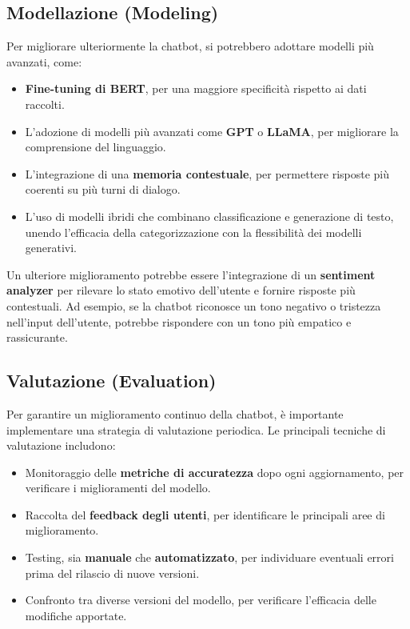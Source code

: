 \documentclass[12pt, letterpaper]{article}
\begin{document}
\subsection{Modellazione (Modeling)}
Per migliorare ulteriormente la chatbot, si potrebbero adottare modelli più avanzati, come:
\begin{itemize}
	\item \textbf{Fine-tuning di BERT}, per una maggiore specificità rispetto ai dati raccolti.
	\item L’adozione di modelli più avanzati come \textbf{GPT} o \textbf{LLaMA}, per migliorare la comprensione del linguaggio.
	\item L'integrazione di una \textbf{memoria contestuale}, per permettere risposte più coerenti su più turni di dialogo.
	\item L’uso di modelli ibridi che combinano classificazione e generazione di testo, unendo l'efficacia della categorizzazione con la flessibilità dei modelli generativi.
\end{itemize}
Un ulteriore miglioramento potrebbe essere l'integrazione di un \textbf{sentiment analyzer} per rilevare lo stato emotivo dell'utente e fornire risposte più contestuali. Ad esempio, se la chatbot riconosce un tono negativo o tristezza nell'input dell'utente, potrebbe rispondere con un tono più empatico e rassicurante.

\subsection{Valutazione (Evaluation)}
Per garantire un miglioramento continuo della chatbot, è importante implementare una strategia di valutazione periodica. Le principali tecniche di valutazione includono:
\begin{itemize}
	\item Monitoraggio delle \textbf{metriche di accuratezza} dopo ogni aggiornamento, per verificare i miglioramenti del modello.
	\item Raccolta del \textbf{feedback degli utenti}, per identificare le principali aree di miglioramento.
	\item Testing, sia \textbf{manuale} che \textbf{automatizzato}, per individuare eventuali errori prima del rilascio di nuove versioni.
	\item Confronto tra diverse versioni del modello, per verificare l'efficacia delle modifiche apportate.
\end{itemize}
\end{document}
